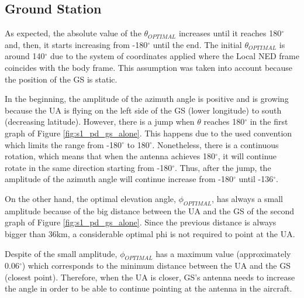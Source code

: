\subsection{Ground Station}\label{GroundStation_scenario1}
As expected, the absolute value of the $\theta_{OPTIMAL}$ increases until it reaches 180$^{\circ}$  and, then, it starts increasing from -180$^{\circ}$ until the end. The initial $\theta_{OPTIMAL}$ is around 140$^{\circ}$ due to the system of coordinates applied where the Local NED frame coincides with the body frame. This assumption was taken into account because the position of the GS is static.

In the beginning, the amplitude of the azimuth angle is positive and is growing because the UA is flying on the left side of the GS (lower longitude) to south (decreasing latitude). However, there is a jump when $\theta$ reaches 180$^{\circ}$ in the first graph of Figure \ref{fig:s1_pd_gs_alone}. This happens due to the used convention which limits the range from -180$^{\circ}$ to 180$^{\circ}$. Nonetheless, there is a continuous rotation, which means that when the antenna achieves 180$^{\circ}$, it will continue rotate in the same direction starting from -180$^{\circ}$. Thus, after the jump, the amplitude of the azimuth angle will continue increase from -180$^{\circ}$ until -136$^{\circ}$.

On the other hand, the optimal elevation angle, $\phi_{OPTIMAL}$, has always a small amplitude because of the big distance between the UA and the GS of the second graph of Figure \ref{fig:s1_pd_gs_alone}. Since the previous distance is always bigger than 36km, a considerable optimal phi is not required to point at the UA. 

Despite of the small amplitude, $\phi_{OPTIMAL}$ has a maximum value (approximately 0.06$^{\circ}$) which corresponds to the minimum distance between the UA and the GS (closest point). Therefore, when the UA is closer, GS’s antenna needs to increase the angle in order to be able to continue pointing at the antenna in the aircraft.

